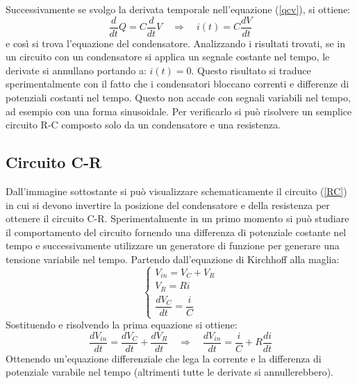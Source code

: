 \documentclass[11pt]{article}
\begin{document}
Successivamente se svolgo la derivata temporale nell'equazione (\ref{qcv}), si ottiene:
\begin{equation}
    \frac{d}{dt}Q=C\frac{d}{dt}V \quad \Longrightarrow \quad i(t)=C\frac{dV}{dt}
\end{equation}
e così si trova l'equazione del condensatore. Analizzando i risultati trovati, se in un circuito con un condensatore si applica un segnale costante nel tempo, le derivate si annullano portando a: $i(t)=0$. Questo risultato si traduce sperimentalmente con il fatto che i condensatori bloccano correnti e differenze di potenziali costanti nel tempo. Questo non accade con segnali variabili nel tempo, ad esempio con una forma sinusoidale. Per verificarlo si può risolvere un semplice circuito R-C composto solo da un condensatore e una resistenza.
\newpage
\subsection{Circuito C-R}
Dall'immagine sottostante si può visualizzare schematicamente il circuito (\ref{RC}) in cui si devono invertire la posizione del condensatore e della resistenza per ottenere il circuito C-R.
Sperimentalmente in un primo momento si può studiare il comportamento del circuito fornendo una differenza di potenziale costante nel tempo e successivamente utilizzare un generatore di funzione per generare una tensione variabile nel tempo. Partendo dall'equazione di Kirchhoff alla maglia:
\begin{equation}
   \begin{cases}
   V_{in}=V_C+V_R\\ V_R=Ri \\ \dfrac{dV_C}{dt}=\dfrac{i}{C}
   \end{cases}
\end{equation}
Sostituendo e risolvendo la prima equazione si ottiene:
\begin{equation}
    \frac{dV_{in}}{dt}=\frac{dV_C}{dt}+\frac{dV_R}{dt} \quad \Rightarrow \quad \frac{dV_{in}}{dt}=\frac{i}{C}+R\frac{di}{dt}
    \label{gg}
\end{equation}
Ottenendo un'equazione differenziale che lega la corrente e la differenza di potenziale varabile nel tempo (altrimenti tutte le derivate si annullerebbero).
\end{document}
